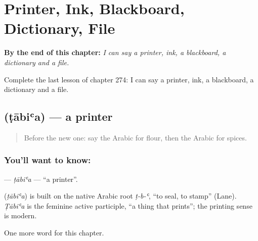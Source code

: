 
\chapter{Printer, Ink, Blackboard, Dictionary, File}
\label{ch:ar-printer-ink-blackboard-dictionary-file}

\begin{chapteropening}
\textbf{By the end of this chapter:} \emph{I can say a printer, ink, a blackboard, a dictionary and a file.}

Complete the last lesson of chapter 274: I can say a printer, ink, a blackboard, a dictionary and a file.
\end{chapteropening}

\section[\texorpdfstring{\ar{طابعة} (ṭābiʿa)}{طابعة (ṭābiʿa)}]{ (ṭābiʿa) — a printer}

\label{lesson:AR-C274-tabia2}



\begin{quote}
Before the new one: say the Arabic for flour, then the Arabic for spices.
\end{quote}

\subsection*{You'll want to know: }
\textbf{} — \emph{ṭābiʿa} — \textquotedblleft{}a printer\textquotedblright{}.

\begin{cousinweb}
\textbf{} (\emph{ṭābiʿa}) is built on the native Arabic root \emph{ṭ-b-ʿ}, \textquotedblleft{}to seal, to stamp\textquotedblright{} (Lane). \emph{Ṭābiʿa} is the feminine active participle, \textquotedblleft{}a thing that prints\textquotedblright{}; the printing sense is modern.
\end{cousinweb}

\begin{grammarlens}[title={What you've built}]
One more word for this chapter.
\end{grammarlens}

